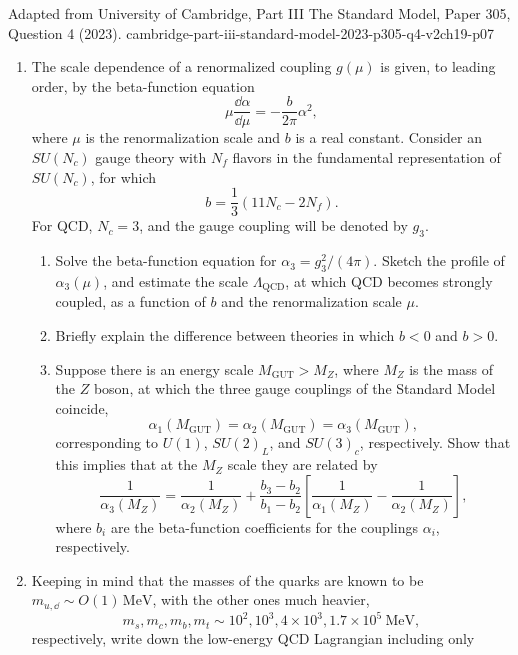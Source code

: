 \begin{enumerate}
  {Adapted from University of Cambridge, Part III The Standard Model,
  Paper 305, Question 4 (2023).}
  {cambridge-part-iii-standard-model-2023-p305-q4-v2ch19-p07}
  \begin{enumerate}
    \item[(a)]
    The scale dependence of a renormalized coupling \(g(\mu)\) is given, to
    leading order, by the beta-function equation
    \[
      \mu\frac{\dd\alpha}{\dd\mu}=-\frac{b}{2\pi}\alpha^2,
    \]
    where \(\mu\) is the renormalization scale and \(b\) is a real constant.
    Consider an \(SU(N_c)\) gauge theory with \(N_f\) flavors in the
    fundamental representation of \(SU(N_c)\), for which
    \[
      b=\frac13(11N_c-2N_f).
    \]
    For QCD, \(N_c=3\), and the gauge coupling will be denoted by \(g_3\).
    \begin{enumerate}
      \item[(i)]
      Solve the beta-function equation for \(\alpha_3=g_3^2/(4\pi)\). Sketch
      the profile of \(\alpha_3(\mu)\), and estimate the scale
      \(\Lambda_{\mathrm{QCD}}\), at which QCD becomes strongly coupled, as
      a function of \(b\) and the renormalization scale \(\mu\).
      \item[(ii)]
      Briefly explain the difference between theories in which \(b<0\) and
      \(b>0\).
      \item[(iii)]
      Suppose there is an energy scale \(M_{\mathrm{GUT}}>M_Z\), where
      \(M_Z\) is the mass of the \(Z\) boson, at which the three gauge
      couplings of the Standard Model coincide,
      \[
        \alpha_1(M_{\mathrm{GUT}})=\alpha_2(M_{\mathrm{GUT}})
          =\alpha_3(M_{\mathrm{GUT}}),
      \]
      corresponding to \(U(1)\), \(SU(2)_L\), and \(SU(3)_c\), respectively.
      Show that this implies that at the \(M_Z\) scale they are related by
      \[
        \frac1{\alpha_3(M_Z)}
        =\frac1{\alpha_2(M_Z)}
        +\frac{b_3-b_2}{b_1-b_2}
          \left[\frac1{\alpha_1(M_Z)}-\frac1{\alpha_2(M_Z)}\right],
      \]
      where \(b_i\) are the beta-function coefficients for the couplings
      \(\alpha_i\), respectively.
    \end{enumerate}
    \item[(b)]
    Keeping in mind that the masses of the quarks are known to be
    \(m_{u,\dd}\sim O(1)\,\mathrm{MeV}\), with the other ones much heavier,
    \[
      m_s,m_c,m_b,m_t\sim
        10^2,10^3,4\times10^3,1.7\times10^5\ \mathrm{MeV},
    \]
    respectively, write down the low-energy QCD Lagrangian including only

\end{enumerate}
\end{enumerate}
